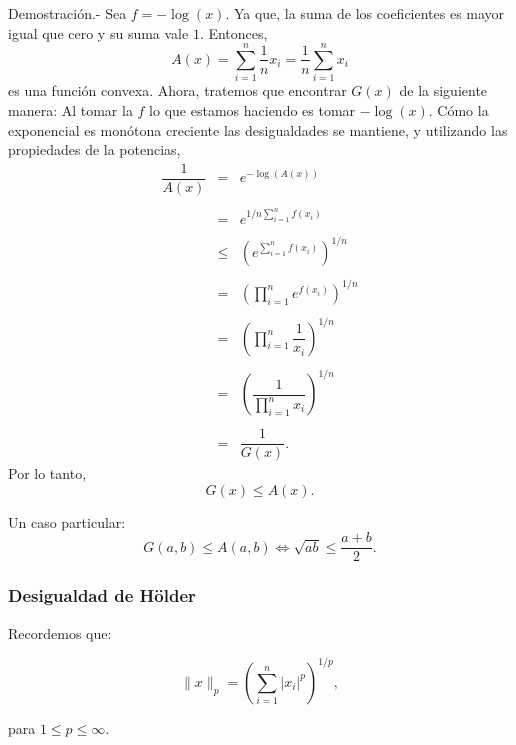 \begin{paracol}{2}
\begin{proposicion}
    Demostración.-\; Sea $f=-\log(x)$. Ya que, la suma de los coeficientes es mayor igual que cero y su suma vale $1$. Entonces,
    $$A(x)=\sum_{i=1}^n \dfrac{1}{n}x_i=\dfrac{1}{n}\sum_{i=1}^n x_i$$ 
    es una función convexa. Ahora, tratemos que encontrar $G(x)$ de la siguiente manera: Al tomar la $f$ lo que estamos haciendo es tomar $-\log(x)$. Cómo la exponencial es monótona creciente las desigualdades se mantiene, y utilizando las propiedades de la potencias,
    $$
    \begin{array}{rcl}
	\dfrac{1}{A(x)}&=&e^{-\log(A(x))}\\\\
		       &=&e^{1/n\sum\limits_{i=1}^n f(x_i)}\\\\
		       &\leq&\left(e^{\sum\limits_{i=1}^n f(x_i)}\right)^{1/n}\\\\
		       &=& \left(\prod\limits_{i=1}^n e^{f(x_i)}\right)^{1/n}\\\\
		       &=&\left(\prod\limits_{i=1}^n \dfrac{1}{x_i}\right)^{1/n}\\\\
		       &=& \left(\dfrac{1}{\prod\limits_{i=1}^n x_i}\right)^{1/n}\\\\
		       &=& \dfrac{1}{G(x)}.
    \end{array}
    $$
    Por lo tanto,
    $$G(x)\leq A(x).$$

    Un caso particular: 
    $$G(a,b)\leq A(a,b) \Leftrightarrow \sqrt{ab}\leq \dfrac{a+b}{2}.$$
\end{proposicion}

\subsubsection{Desigualdad de Hölder}

Recordemos que:

$$\|x\|_p=\left(\sum_{i=1}^n |x_i|^p\right)^{1/p},$$

para $1\leq p\leq \infty$.


\end{paracol}
